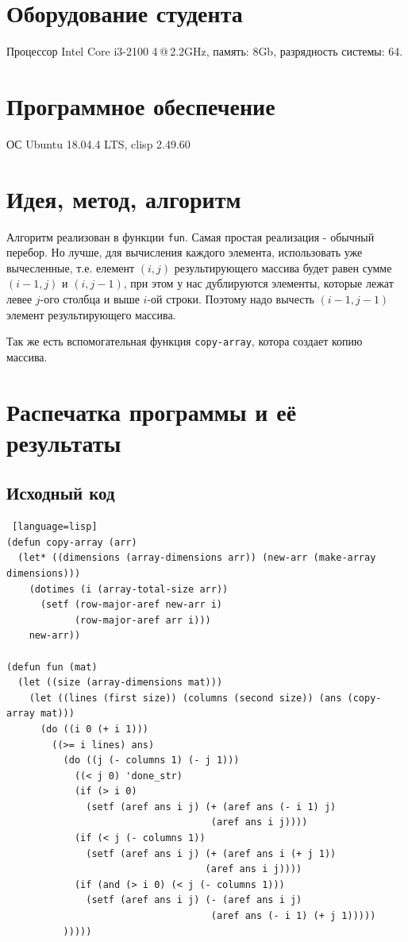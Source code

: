 \documentclass[12pt]{article}
\begin{document}
\section{Оборудование студента}
Процессор Intel Core i3-2100 4\,@\,2.2GHz, память: 8Gb, разрядность системы: 64.

\section{Программное обеспечение}
ОС Ubuntu 18.04.4 LTS, clisp 2.49.60

\pagebreak

\section{Идея, метод, алгоритм}
Алгоритм реализован в функции {\tt fun}.
Самая простая реализация - обычный перебор. Но лучше, для вычисления каждого элемента, использовать уже вычесленные, т.е. елемент $(i, j)$ результирующего массива будет равен сумме $(i - 1, j)$ и $(i, j - 1)$, при этом у нас дублируются элементы, которые лежат левее $j$-ого столбца и выше $i$-ой строки.
Поэтому надо вычесть $(i - 1, j - 1)$ элемент результирующего массива.

Так же есть вспомогательная функция {\tt copy-array}, котора создает копию массива.
\section{Распечатка программы и её результаты}
\subsection{Исходный код}
\begin{lstlisting} [language=lisp]
(defun copy-array (arr)
  (let* ((dimensions (array-dimensions arr)) (new-arr (make-array dimensions)))
    (dotimes (i (array-total-size arr))
      (setf (row-major-aref new-arr i)
            (row-major-aref arr i)))
    new-arr))

(defun fun (mat)
  (let ((size (array-dimensions mat)))
    (let ((lines (first size)) (columns (second size)) (ans (copy-array mat)))
      (do ((i 0 (+ i 1)))
        ((>= i lines) ans)
          (do ((j (- columns 1) (- j 1)))
            ((< j 0) 'done_str)
            (if (> i 0)
              (setf (aref ans i j) (+ (aref ans (- i 1) j)
                                    (aref ans i j))))
            (if (< j (- columns 1)) 
              (setf (aref ans i j) (+ (aref ans i (+ j 1))
                                   (aref ans i j))))
            (if (and (> i 0) (< j (- columns 1)))
              (setf (aref ans i j) (- (aref ans i j)
                                    (aref ans (- i 1) (+ j 1)))))
          )))))
\end{lstlisting}
\end{document}
